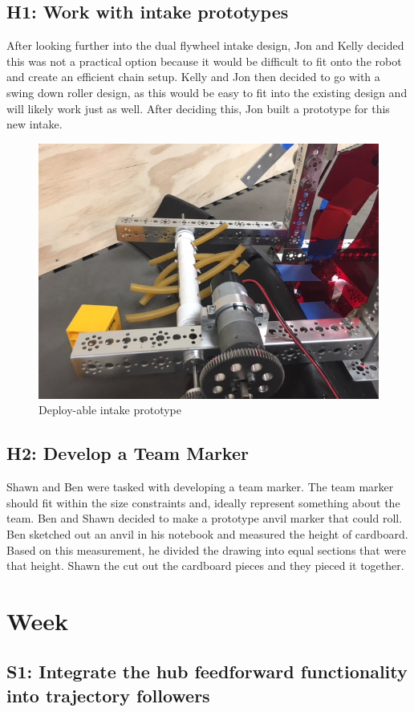 \documentclass{article}
\begin{document}
\subsection{H1: Work with intake prototypes}

After looking further into the dual flywheel intake design, Jon and Kelly decided this was not a practical option because it would be difficult to fit onto the robot and create an efficient chain setup. Kelly and Jon then decided to go with a swing down roller design, as this would be easy to fit into the existing design and will likely work just as well. After deciding this, Jon built a prototype for this new intake. 

\begin{figure}
    \centering
    \includegraphics[width=.6\textwidth]{03_09-17/images/IMG_0262.JPG}
    \caption{Deploy-able intake prototype}
    \label{fig:my_label}
\end{figure}

\subsection{H2: Develop a Team Marker}

Shawn and Ben were tasked with developing a team marker. The team marker should fit within the size constraints and, ideally represent something about the team. Ben and Shawn decided to make a prototype anvil marker that could roll. Ben sketched out an anvil in his notebook and measured the height of cardboard. Based on this measurement, he divided the drawing into equal sections that were that height. Shawn the cut out the cardboard pieces and they pieced it together.\clearpage \newpage \section{Week \thesection} 
\subsection{S1: Integrate the hub feedforward functionality into trajectory followers}
\end{document}
